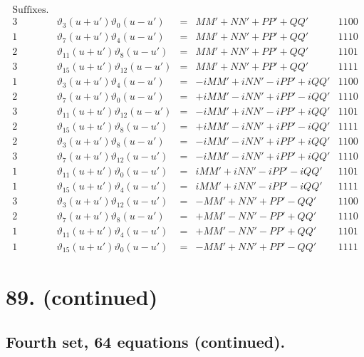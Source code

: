 \documentclass[11pt,a4paper]{article}
\newcommand{\uth}[1]{\vartheta_{#1}}
\begin{document}
\[
\begin{array}{ccccc}
\text{Suffixes.} & & & & \\
\hline
3 & \uth{3}(u+u')\uth{0}(u-u') &=& MM' + NN' + PP' + QQ' & 1100 \\
1 & \uth{7}(u+u')\uth{4}(u-u') &=& MM' + NN' + PP' + QQ' & 1110 \\
2 & \uth{11}(u+u')\uth{8}(u-u') &=& MM' + NN' + PP' + QQ' & 1101 \\
3 & \uth{15}(u+u')\uth{12}(u-u') &=& MM' + NN' + PP' + QQ' & 1111 \\
\hline
1 & \uth{3}(u+u')\uth{4}(u-u') &=& -iMM' + iNN' - iPP' + iQQ' & 1100 \\
2 & \uth{7}(u+u')\uth{0}(u-u') &=& +iMM' - iNN' + iPP' - iQQ' & 1110 \\
3 & \uth{11}(u+u')\uth{12}(u-u') &=& -iMM' + iNN' - iPP' + iQQ' & 1101 \\
2 & \uth{15}(u+u')\uth{8}(u-u') &=& +iMM' - iNN' + iPP' - iQQ' & 1111 \\
\hline
2 & \uth{3}(u+u')\uth{8}(u-u') &=& -iMM' - iNN' + iPP' + iQQ' & 1100 \\
3 & \uth{7}(u+u')\uth{12}(u-u') &=& -iMM' - iNN' + iPP' + iQQ' & 1110 \\
1 & \uth{11}(u+u')\uth{0}(u-u') &=& iMM' + iNN' - iPP' - iQQ' & 1101 \\
1 & \uth{15}(u+u')\uth{4}(u-u') &=& iMM' + iNN' - iPP' - iQQ' & 1111 \\
\hline
3 & \uth{3}(u+u')\uth{12}(u-u') &=& -MM' + NN' + PP' - QQ' & 1100 \\
2 & \uth{7}(u+u')\uth{8}(u-u') &=& +MM' - NN' - PP' + QQ' & 1110 \\
1 & \uth{11}(u+u')\uth{4}(u-u') &=& +MM' - NN' - PP' + QQ' & 1101 \\
1 & \uth{15}(u+u')\uth{0}(u-u') &=& -MM' + NN' + PP' - QQ' & 1111
\end{array}
\]


\newpage
\section*{89. (continued)}
\label{sec:89cont}

\subsection*{Fourth set, 64 equations (continued).}
\end{document}
